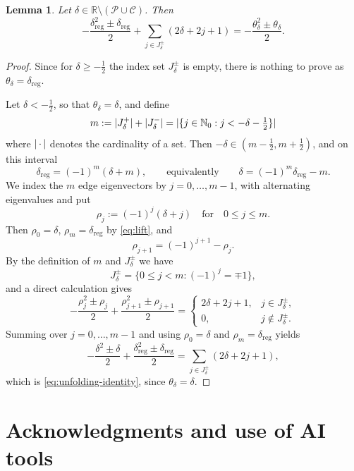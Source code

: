 \documentclass[11pt,a4paper,reqno]{amsart}
\newtheorem{lemma}[theorem]{Lemma}
\theoremstyle{remark}
\newcommand{\Nzero}{\mathbb N_0}
\newcommand{\R}{\mathbb R}
\DeclarePairedDelimiter{\abs}{\lvert}{\rvert}
\begin{document}
\begin{lemma}\label{lem:unfolding}
Let $\delta\in\R\setminus(\mathcal P\cup\mathcal C)$.
Then
\begin{equation}\label{eq:unfolding-identity}
 -\frac{\delta_{\text{reg}}^2\pm \delta_{\text{reg}}}{2}
 +\sum_{j\in J_\delta^\pm}(2\delta + 2j + 1)
 =-\frac{\theta_\delta^2\pm\theta_\delta}{2}.
\end{equation}
\end{lemma}

\begin{proof}
Since for $\delta \geq -\frac 12$ the index set $J^\pm_\delta$ is empty, there is nothing to prove as $\theta_\delta = \delta_{\text{reg}}$.

Let $\delta < -\frac12$, so that $\theta_\delta=\delta$, and define
\begin{equation}\label{eq:m-def}
 m := \abs{J_\delta^+} + \abs{J_\delta^-} = \abs{\{j\in\Nzero:j<-\delta-\tfrac12\}}
\end{equation}
where $\abs{\,\cdot\,}$ denotes the cardinality of a set.
Then $-\delta\in(m-\frac12,m+\frac12)$, and on this interval
\begin{equation}\label{eq:lift}
 \delta_{\text{reg}}=(-1)^m(\delta+m),
 \qquad\text{equivalently}\qquad
 \delta=(-1)^m\delta_{\text{reg}}-m.
\end{equation}
We index the $m$ edge eigenvectors by $j=0,\ldots,m-1$, with
alternating eigenvalues and put
\[
 \rho_j:=(-1)^j(\delta+j) \quad \text{for} \quad 0\le j \le m.
\]
Then $\rho_0=\delta$, $\rho_m=\delta_{\mathrm{reg}}$ by
\eqref{eq:lift}, and
\[
 \rho_{j+1}=(-1)^{j+1}-\rho_j.
\]
By the definition of $m$ and $J_\delta^\pm$ we have
\[
 J_\delta^\pm=\{0\leq j<m:(-1)^j=\mp1\},
\]
and a direct calculation gives
\[
 -\frac{\rho_j^2\pm\rho_j}{2}
 +\frac{\rho_{j+1}^2\pm\rho_{j+1}}{2}
 =
 \begin{cases}
  2\delta+2j+1,&j\in J_\delta^\pm,\\
  0,&j\notin J_\delta^\pm.
 \end{cases}
\]
Summing over $j=0,\ldots,m-1$ and using
$\rho_0=\delta$ and $\rho_m=\delta_{\mathrm{reg}}$ yields
\[
 -\frac{\delta^2\pm\delta}{2}
 +\frac{\delta_{\mathrm{reg}}^2\pm\delta_{\mathrm{reg}}}{2}
 =
 \sum_{j\in J_\delta^\pm}(2\delta+2j+1),
\]
which is \eqref{eq:unfolding-identity}, since $\theta_\delta=\delta$.
\end{proof}


\section*{Acknowledgments and use of AI tools}
\end{document}
